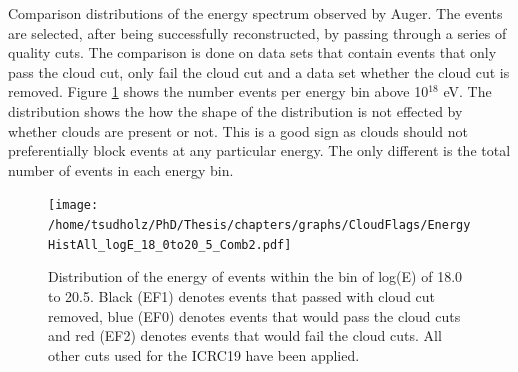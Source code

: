 Comparison distributions of the energy spectrum observed by Auger. The events are selected, after being successfully reconstructed, by passing through a series of quality cuts. The comparison is done on data sets that contain events that only pass the cloud cut, only fail the cloud cut and a data set whether the cloud cut is removed. Figure \ref{fig:cloudFlag_energyDist} shows the number events per energy bin above 10$^{18}$ eV. The distribution shows the how the shape of the distribution is not effected by whether clouds are present or not. This is a good sign as clouds should not preferentially block events at any particular energy. The only different is the total number of events in each energy bin.

\begin{figure}
\centering
\texttt{[image: /home/tsudholz/PhD/Thesis/chapters/graphs/CloudFlags/EnergyHistAll\_logE\_18\_0to20\_5\_Comb2.pdf]}
\caption{Distribution of the energy of events within the bin of log(E) of 18.0 to 20.5. Black (EF1) denotes events that passed with cloud cut removed, blue (EF0) denotes events that would pass the cloud cuts and red (EF2) denotes events that would fail the cloud cuts. All other cuts used for the ICRC19 have been applied.} \label{fig:cloudFlag_energyDist}
\end{figure}

